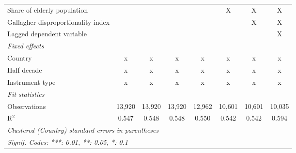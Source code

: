 \begin{tabular}{lccccccc}
   Share of elderly population                                                        &              &         &         &         & X            & X            & X\\  
   Gallagher disproportionality index                                                 &              &         &         &         &              & X            & X\\  
   Lagged dependent variable                                                          &              &         &         &         &              &              & X\\  
   \emph{Fixed effects}\\
   Country                                                                            & x            & x       & x       & x       & x            & x            & x\\  
   Half decade                                                                        & x            & x       & x       & x       & x            & x            & x\\  
   Instrument type                                                                    & x            & x       & x       & x       & x            & x            & x\\  
   \midrule \emph{Fit statistics}\\
   Observations                                                                       & 13,920       & 13,920  & 13,920  & 12,962  & 10,601       & 10,601       & 10,035\\  
   R$^2$                                                                              & 0.547        & 0.548   & 0.548   & 0.550   & 0.542        & 0.542        & 0.594\\  
   \midrule
   \multicolumn{8}{l}{\emph{Clustered (Country) standard-errors in parentheses}}\\
   \multicolumn{8}{l}{\emph{Signif. Codes: ***: 0.01, **: 0.05, *: 0.1}}\\
\end{tabular}
\par\endgroup


